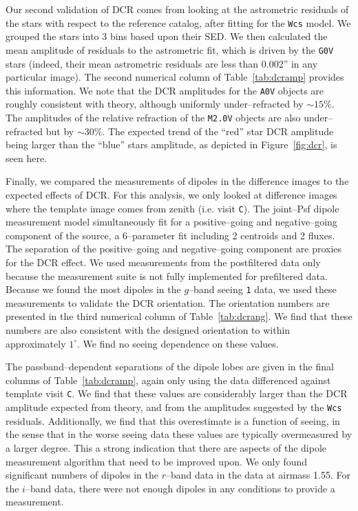 \documentclass[prd, nofootinbib, floatfix, 11pt, tightenlines, times]{article}
\def\C{{\tt C}}
\begin{document}
Our second validation of DCR comes from looking at the astrometric
residuals of the stars with respect to the reference catalog, after
fitting for the {\tt Wcs} model.  We grouped the stars into 3 bins
based upon their SED.  We then calculated the mean amplitude of
residuals to the astrometric fit, which is driven by the {\tt G0V}
stars (indeed, their mean astrometric residuals are less than 0.002''
in any particular image).  The second numerical column of
Table~\ref{tab:dcramp} provides this information.  We note that the
DCR amplitudes for the {\tt A0V} objects are roughly consistent with
theory, although uniformly under--refracted by $\sim 15\%$.  The
amplitudes of the relative refraction of the {\tt M2.0V} objects are
also under--refracted but by $\sim 30\%$.  The expected trend of the
``red'' star DCR amplitude being larger than the ``blue'' stars
amplitude, as depicted in Figure~\ref{fig:dcr}, is seen here.

Finally, we compared the measurements of dipoles in the difference
images to the expected effects of DCR.  For this analysis, we only
looked at difference images where the template image comes from zenith
(i.e. visit \C).  The joint--Psf dipole measurement model
simultaneously fit for a positive--going and negative--going component
of the source, a 6--parameter fit including 2 centroids and 2 fluxes.
The separation of the positive--going and negative--going component
are proxies for the DCR effect.  We used measurements from the
postfiltered data only because the measurement suite is not fully
implemented for prefiltered data.  Because we found the most dipoles
in the $g$--band seeing {\tt 1} data, we used these measurements to
validate the DCR orientation.  The orientation numbers are presented
in the third numerical column of Table~\ref{tab:dcrang}.  We find that
these numbers are also consistent with the designed orientation to
within approximately $1^{\circ}$.  We find no seeing dependence on
these values.

The passband--dependent separations of the dipole lobes are given in
the final columns of Table~\ref{tab:dcramp}, again only using the data
differenced against template visit \C.  We find that these values are
considerably larger than the DCR amplitude expected from theory, and
from the amplitudes suggested by the {\tt Wcs} residuals.
Additionally, we find that this overestimate is a function of seeing,
in the sense that in the worse seeing data these values are typically
overmeasured by a larger degree.  This a strong indication that there
are aspects of the dipole measurement algorithm that need to be
improved upon.  We only found significant numbers of dipoles in the
$r$--band data in the data at airmass 1.55.  For the $i$--band data,
there were not enough dipoles in any conditions to provide a
measurement.
\end{document}
